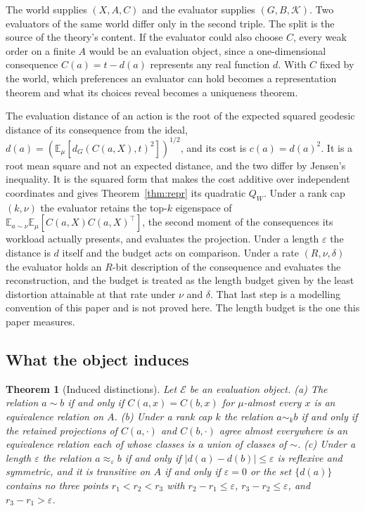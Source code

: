 \documentclass{article}
\newtheorem{theorem}{Theorem}
\theoremstyle{definition}
\theoremstyle{remark}
\newcommand{\Ev}{\mathcal{E}}
\newcommand{\K}{\mathcal{K}}
\newcommand{\Ex}{\mathbb{E}}
\newcommand{\dG}{d_{G}}
\begin{document}
The world supplies $(X,A,C)$ and the evaluator supplies $(G,B,\K)$.
Two evaluators of the same world differ only in the second triple.
The split is the source of the theory's content.
If the evaluator could also choose $C$, every weak order on a finite $A$ would be an evaluation object, since a one-dimensional consequence $C(a)=t-d(a)$ represents any real function $d$.
With $C$ fixed by the world, which preferences an evaluator can hold becomes a representation theorem and what its choices reveal becomes a uniqueness theorem.

The evaluation distance of an action is the root of the expected squared geodesic distance of its consequence from the ideal, $d(a)=(\Ex_{\mu}[\dG(C(a,X),t)^{2}])^{1/2}$, and its cost is $c(a)=d(a)^{2}$.
It is a root mean square and not an expected distance, and the two differ by Jensen's inequality. It is the squared form that makes the cost additive over independent coordinates and gives Theorem~\ref{thm:repr} its quadratic $Q_{W}$.
Under a rank cap $(k,\nu)$ the evaluator retains the top-$k$ eigenspace of $\Ex_{a\sim\nu}\Ex_{\mu}[C(a,X)C(a,X)^{\top}]$, the second moment of the consequences its workload actually presents, and evaluates the projection.
Under a length $\varepsilon$ the distance is $d$ itself and the budget acts on comparison.
Under a rate $(R,\nu,\delta)$ the evaluator holds an $R$-bit description of the consequence and evaluates the reconstruction, and the budget is treated as the length budget given by the least distortion attainable at that rate under $\nu$ and $\delta$. That last step is a modelling convention of this paper and is not proved here.
The length budget is the one this paper measures.

\subsection{What the object induces}
\label{sec:derive}

\begin{theorem}[Induced distinctions]
\label{thm:dist}
Let $\Ev$ be an evaluation object.
(a) The relation $a\sim b$ if and only if $C(a,x)=C(b,x)$ for $\mu$-almost every $x$ is an equivalence relation on $A$.
(b) Under a rank cap $k$ the relation $a\sim_{k}b$ if and only if the retained projections of $C(a,\cdot)$ and $C(b,\cdot)$ agree almost everywhere is an equivalence relation each of whose classes is a union of classes of $\sim$.
(c) Under a length $\varepsilon$ the relation $a\approx_{\varepsilon}b$ if and only if $|d(a)-d(b)|\le\varepsilon$ is reflexive and symmetric, and it is transitive on $A$ if and only if $\varepsilon=0$ or the set $\{d(a)\}$ contains no three points $r_{1}<r_{2}<r_{3}$ with $r_{2}-r_{1}\le\varepsilon$, $r_{3}-r_{2}\le\varepsilon$, and $r_{3}-r_{1}>\varepsilon$.
\end{theorem}
\end{document}
